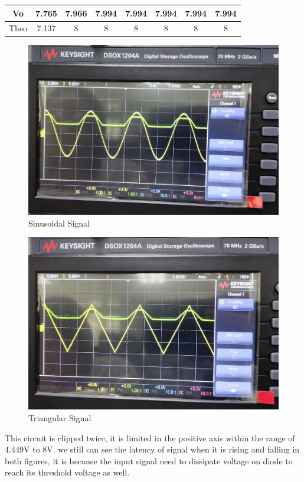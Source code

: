 \begin{itemize}
\begin{table}[h]
\begin{tabular}{|c|c|c|c|c|c|c|c|}
                Vo   & 7.765 & 7.966 & 7.994 & 7.994 & 7.994 & 7.994 & 7.994 \\ \hline
                Theo & 7.137 & 8     & 8     & 8     & 8     & 8     & 8     \\ \hline
            \end{tabular}
            \end{table}
            \FloatBarrier
            \begin{figure}[h]
                \centering
                \includegraphics[width=0.65\linewidth]{Lab02/2.6_sin_clipper2.jpg}
                \caption{Sinusoidal Signal}
                \label{2.6sin}
            \end{figure}
            \FloatBarrier
            \begin{figure}[h]
                \centering
                \includegraphics[width=0.65\linewidth]{Lab02/2.6_tri_clipper2.jpg}
                \caption{Triangular Signal}
                \label{2.6tri}
            \end{figure}
            \FloatBarrier
            This circuit is clipped twice, it is limited in the positive axis within the range of 4.449V to 8V. we still can see the latency of signal when it is rising and falling in both figures, it is because the input signal need to dissipate voltage on diode to reach its threshold voltage as well.


\end{itemize}
